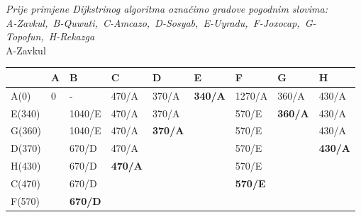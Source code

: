 \documentclass[12pt]{article}
\begin{document}
\begin{enumerate}
     \vspace{0.75cm}
     \begin{center}
         \textit{Prije primjene Dijkstrinog algoritma označimo gradove pogodnim slovima:\\
         A-Zavkul,\
         B-Quwuti,\
         C-Amcazo,\
         D-Sosyab,\
         E-Uyradu,\
         F-Joxocap,\
         G-Topofun,\
         H-Rekazga\\}
         \vspace{0.5cm}
         A-Zavkul
         
\begin{tabular}{|l|l|l|llllll}
\hline
 & A & B & \multicolumn{1}{l|}{C} & \multicolumn{1}{l|}{D} & \multicolumn{1}{l|}{E} & \multicolumn{1}{l|}{F} & \multicolumn{1}{l|}{G} & \multicolumn{1}{l|}{H} \\ \hline
A(0) & 0 & - & \multicolumn{1}{l|}{470/A} & \multicolumn{1}{l|}{370/A} & \multicolumn{1}{l|}{\textbf{340/A}} & \multicolumn{1}{l|}{1270/A} & \multicolumn{1}{l|}{360/A} & \multicolumn{1}{l|}{430/A} \\ \hline
E(340) &  & 1040/E & \multicolumn{1}{l|}{470/A} & \multicolumn{1}{l|}{370/A} & \multicolumn{1}{l|}{} & \multicolumn{1}{l|}{570/E} & \multicolumn{1}{l|}{\textbf{360/A}} & \multicolumn{1}{l|}{430/A} \\ \cline{1-1} \cline{3-5} \cline{7-9} 
G(360) &  & 1040/E & \multicolumn{1}{l|}{470/A} & \multicolumn{1}{l|}{\textbf{370/A}} & \multicolumn{1}{l|}{} & \multicolumn{1}{l|}{570/E} & \multicolumn{1}{l|}{} & \multicolumn{1}{l|}{430/A} \\ \cline{1-1} \cline{3-5} \cline{7-7} \cline{9-9} 
D(370) &  & 670/D & \multicolumn{1}{l|}{470/A} &  & \multicolumn{1}{l|}{} & \multicolumn{1}{l|}{570/E} & \multicolumn{1}{l|}{} & \multicolumn{1}{l|}{\textbf{430/A}} \\ \cline{1-1} \cline{3-4} \cline{7-7} \cline{9-9} 
H(430) &  & 670/D & \multicolumn{1}{l|}{\textbf{470/A}} &  & \multicolumn{1}{l|}{} & \multicolumn{1}{l|}{570/E} &  &  \\ \cline{1-1} \cline{3-4} \cline{7-7}
C(470) &  & 670/D &  &  & \multicolumn{1}{l|}{} & \multicolumn{1}{l|}{\textbf{570/E}} &  &  \\ \cline{1-1} \cline{3-3} \cline{7-7}
F(570) &  & \textbf{670/D} &  &  &  & \textbf{} &  &  \\ \cline{1-1} \cline{3-3}
\end{tabular}
\\
      \vspace{0.5cm}   
         \newpage
         

\end{center}
\end{enumerate}
\end{document}
